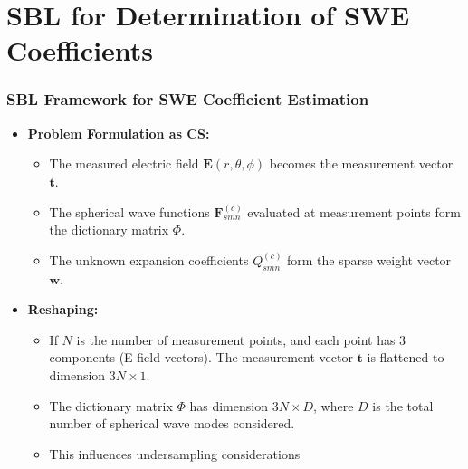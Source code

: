 \documentclass{beamer}
\begin{document}
\section{SBL for Determination of SWE Coefficients}

\begin{frame}
    \frametitle{SBL Framework for SWE Coefficient Estimation}
    \begin{itemize}
        \item \textbf{Problem Formulation as CS:}
        \begin{itemize}
            \item The measured electric field $\mathbf{E}(r,\theta,\phi)$ becomes the measurement vector $\mathbf{t}$.
            \item The spherical wave functions $\mathbf{F}_{smn}^{(c)}$ evaluated at measurement points form the dictionary matrix $\Phi$.
            \item The unknown expansion coefficients $Q_{smn}^{(c)}$ form the sparse weight vector $\mathbf{w}$.
        \end{itemize}
        \item \textbf{Reshaping:}
        \begin{itemize}
            \item If $N$ is the number of measurement points, and each point has 3 components (E-field vectors). The measurement vector $\mathbf{t}$ is flattened to dimension $3N \times 1$.
            \item The dictionary matrix $\Phi$ has dimension $3N \times D$, where $D$ is the total number of spherical wave modes considered.
            \item This influences undersampling considerations
        \end{itemize}
	\end{itemize}
\end{frame}
\end{document}
